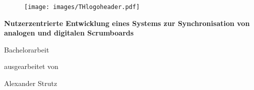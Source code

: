 \begin{titlepage}

\begin{center}

\begin{figure}[!ht]
		\texttt{[image: images/THlogoheader.pdf]}
\end{figure}

\vspace{0.4cm}

\begin{rmfamily}
\begin{huge}
\textbf{Nutzerzentrierte Entwicklung eines Systems zur Synchronisation von analogen und digitalen Scrumboards}\\	
\end{huge}
\vspace{0.5cm}
\end{rmfamily}

\vspace{0.8cm}



\begin{LARGE}
\begin{scshape}
Bachelorarbeit\\[0.8em]
\end{scshape}
\end{LARGE}

\begin{large}
ausgearbeitet von\\ 
\vspace{0.3cm}
\begin{LARGE}
Alexander Strutz\\
\end{LARGE}
\end{large}


\end{center}
\end{titlepage}
